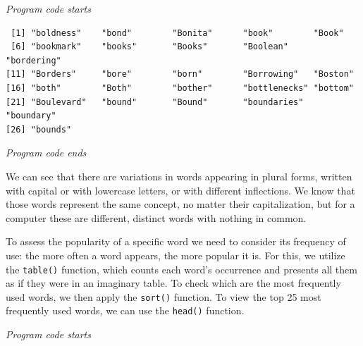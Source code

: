 \emph{Program code starts}

\begin{Shaded}
\begin{Highlighting}[]
\OtherTok{\textless{}{-}} \NormalTok{(}

\NormalTok{s\_etext[}\SpecialCharTok{:}\NormalTok{]}
\end{Highlighting}
\end{Shaded}

\begin{verbatim}
 [1] "boldness"    "bond"        "Bonita"      "book"        "Book"       
 [6] "bookmark"    "books"       "Books"       "Boolean"     "bordering"  
[11] "Borders"     "bore"        "born"        "Borrowing"   "Boston"     
[16] "both"        "Both"        "bother"      "bottlenecks" "bottom"     
[21] "Boulevard"   "bound"       "Bound"       "boundaries"  "boundary"   
[26] "bounds"     
\end{verbatim}

\emph{Program code ends}

We can see that there are variations in words appearing in plural forms, written with
capital or with lowercase letters, or with different inflections. We
know that those words represent the same concept, no matter their
capitalization, but for a computer these are different, distinct words
with nothing in common.

To assess the popularity of a specific word we need to consider its frequency
of use: the more often a word appears, the more popular it is. For this,
we utilize the \texttt{table()} function, which counts
each word's occurrence and presents all them as if they were in an imaginary table.
To check which are the most frequently used words, we then apply the
\texttt{sort()} function. To view the top 25 most frequently used words, we can
use the \texttt{head()} function.

\emph{Program code starts}

\begin{Shaded}
\begin{Highlighting}[]
\OtherTok{\textless{}{-}} \NormalTok{(} \NormalTok{)}
\NormalTok{)}
\end{Highlighting}
\end{Shaded}

